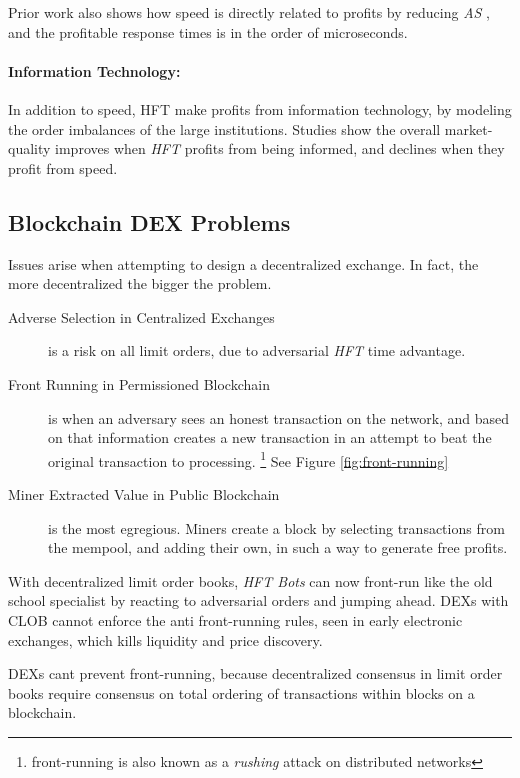 \documentclass[12pt]{article}
\begin{document}
Prior work also shows how speed is directly related to profits by reducing \emph{AS} \cite{Lehalle},  and the profitable response times is in the order of microseconds. \cite{Menkveld2} 

\paragraph{Information Technology:} In addition to speed, HFT make profits from information technology, by modeling the order imbalances of the large institutions. Studies show the overall market-quality improves when \emph{HFT} profits from being informed, and declines when they profit from speed. \cite{Menkveld2}


\subsection*{Blockchain DEX Problems}

Issues arise when attempting to design a decentralized exchange. In fact, the more decentralized the bigger the problem. 

\begin{description}
\item[Adverse Selection in Centralized Exchanges] is a risk on all limit orders, due to adversarial \emph{HFT} time advantage. 
\item[Front Running in Permissioned Blockchain] is when an adversary sees an honest transaction on the network, and based on that information creates a new transaction in an attempt to beat the original transaction to processing. \footnote{front-running is also known as a \emph{rushing} attack on distributed networks} See Figure \ref{fig:front-running} \cite{Eskandari} 
\item[Miner Extracted Value in Public Blockchain] is the most egregious. Miners create a block by selecting transactions from the mempool, and adding their own, in such a way to generate free profits. 
\end{description}

With decentralized limit order books, \emph{HFT Bots} can now front-run like the old school specialist by reacting to adversarial orders and jumping ahead. 
DEXs with CLOB cannot enforce the anti front-running rules, seen in early electronic exchanges, which kills liquidity and price discovery. 

DEXs cant prevent front-running, because decentralized consensus in limit order books require consensus on total ordering of transactions within blocks on a blockchain.
\end{document}
